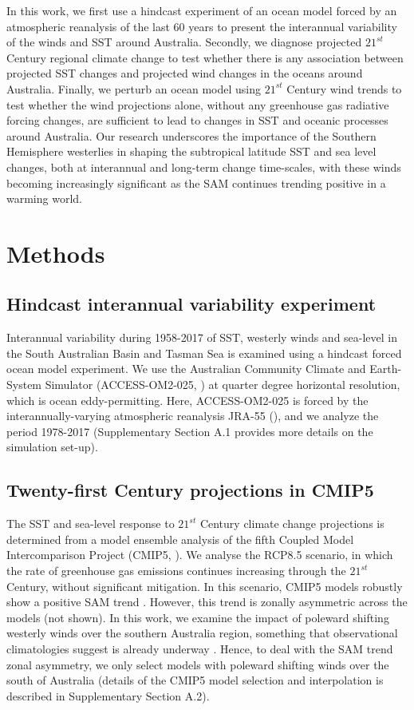\documentclass[draft,linenumbers]{agujournal2018}
\begin{document}
In this work, we first use a hindcast experiment of an ocean model forced by an atmospheric reanalysis of the last 60 years to present the interannual variability of the winds and SST around Australia. Secondly, we diagnose projected $21^{st}$ Century regional climate change to test whether there is any association between projected SST changes and projected wind changes in the oceans around Australia. Finally, we perturb an ocean model using $21^{st}$ Century wind trends to test whether the wind projections alone, without any greenhouse gas radiative forcing changes, are sufficient to lead to changes in SST and oceanic processes around Australia. Our research underscores the importance of the Southern Hemisphere westerlies in shaping the subtropical latitude SST and sea level changes, both at interannual and long-term change time-scales, with these winds becoming increasingly significant as the SAM continues trending positive in a warming world.

\section{Methods}
\subsection{Hindcast interannual variability experiment}
Interannual variability during 1958-2017 of SST, westerly winds and sea-level in the South Australian Basin and Tasman Sea is examined using a hindcast forced ocean model experiment. We use the Australian Community Climate and Earth-System Simulator (ACCESS-OM2-025, \citealp{Kiss2019}) at quarter degree horizontal resolution, which is ocean eddy-permitting. Here, ACCESS-OM2-025 is forced by the interannually-varying atmospheric reanalysis JRA-55 (\citealp{Kobayashi2015}), and we analyze the period 1978-2017 (Supplementary Section A.1 provides more details on the simulation set-up).

\subsection{Twenty-first Century projections in CMIP5} \label{Twenty-first Century analysis in CMIP5}
The SST and sea-level response to $21^{st}$ Century climate change projections is determined from a model ensemble analysis of the fifth Coupled Model Intercomparison Project (CMIP5, \citealp{Taylor2012}). We analyse the RCP8.5 scenario, in which the rate of greenhouse gas emissions continues increasing through the $21^{st}$ Century, without significant mitigation. In this scenario, CMIP5 models robustly show a positive SAM trend \citep{Bracegirdle2013}. However, this trend is zonally asymmetric across the models (not shown). In this work, we examine the impact of poleward shifting westerly winds over the southern Australia region, something that observational climatologies suggest is already underway \citep{Reichler2016}. Hence, to deal with the SAM trend zonal asymmetry, we only select models with poleward shifting winds over the south of Australia (details of the CMIP5 model selection and interpolation is described in Supplementary Section A.2).
\end{document}
